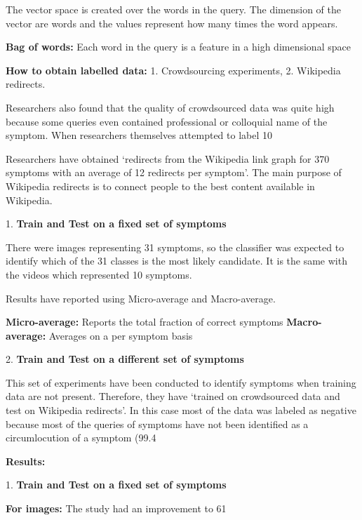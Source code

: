 \documentclass[]{article}
\begin{document}
The vector space is created over the words in the query. The dimension of the vector are words and the values represent how many times the word appears.  

\textbf{Bag of words:} Each word in the query is a feature in a high dimensional space 

\textbf{How to obtain labelled data:} 1. Crowdsourcing experiments, 2. Wikipedia redirects. 

Researchers also found that the quality of crowdsourced data was quite high because some queries even contained professional or colloquial name of the symptom. When researchers themselves attempted to label 10%

Researchers have obtained ‘redirects from the Wikipedia link graph for 370 symptoms with an average of 12 redirects per symptom’. The main purpose of Wikipedia redirects is to connect people to the best content available in Wikipedia.    

1.	\textbf{Train and Test on a fixed set of symptoms}

There were images representing 31 symptoms, so the classifier was expected to identify which of the 31 classes is the most likely candidate. It is the same with the videos which represented 10 symptoms.
 
Results have reported using Micro-average and Macro-average. 

\textbf{Micro-average:} Reports the total fraction of correct symptoms  
\textbf{Macro-average:} Averages on a per symptom basis

2.\textbf{	Train and Test on a different set of symptoms}

This set of experiments have been conducted to identify symptoms when training data are not present. Therefore, they have ‘trained on crowdsourced data and test on Wikipedia redirects’. In this case most of the data was labeled as negative because most of the queries of symptoms have not been identified as a circumlocution of a symptom (99.4%

\textbf{Results: }

1.\textbf{	Train and Test on a fixed set of symptoms}

\textbf{For images:} The study had an improvement to 61%
\end{document}
